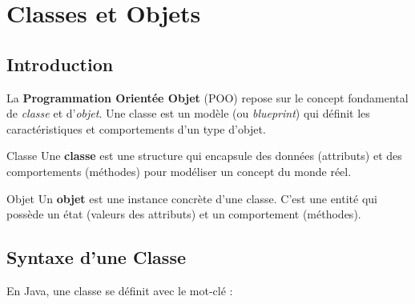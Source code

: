 
\section{Classes et Objets}
\label{sec:classes-objets}


\subsection{Introduction}

La \textbf{Programmation Orientée Objet} (POO) repose sur le concept fondamental de \emph{classe} et d'\emph{objet}. Une classe est un modèle (ou \textit{blueprint}) qui définit les caractéristiques et comportements d'un type d'objet.

\begin{definition}{Classe}
    Une \textbf{classe} est une structure qui encapsule des données (attributs) et des comportements (méthodes) pour modéliser un concept du monde réel.
\end{definition}

\begin{definition}{Objet}
    Un \textbf{objet} est une instance concrète d'une classe. C'est une entité qui possède un état (valeurs des attributs) et un comportement (méthodes).
\end{definition}


\subsection{Syntaxe d'une Classe}

En Java, une classe se définit avec le mot-clé  :

